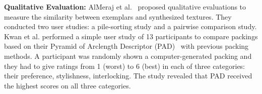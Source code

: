 


\textbf{Qualitative Evaluation:}
AlMeraj et al.~\cite{AlMerajEval2013} proposed qualitative evaluations to measure
the similarity between exemplars and synthesized textures.
They conducted two user studies: a pile-sorting study and a pairwise comparison study.
Kwan et al. performed a simple user study of 13 participants to compare 
packings based on their Pyramid of Arclength Descriptor (PAD)~\cite{Kwan2016} with previous packing methods.
A participant was randomly shown a computer-generated packing and they had to give ratings from 1 (worst) to 6 (best)
in each of three categories: their preference, stylishness, interlocking.
The study revealed that PAD received the highest scores on all three categories.

